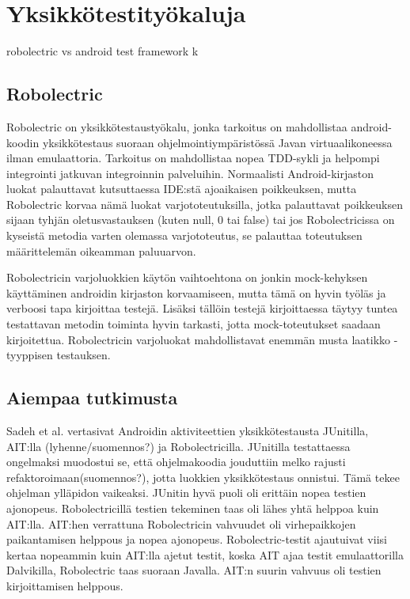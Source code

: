 \section{Yksikkötestityökaluja}

robolectric vs android test framework k

\subsection{Robolectric}

Robolectric on yksikkötestaustyökalu, jonka tarkoitus on mahdollistaa android-koodin yksikkötestaus suoraan ohjelmointiympäristössä Javan virtuaalikoneessa ilman emulaattoria. Tarkoitus on mahdollistaa nopea TDD-sykli ja helpompi integrointi jatkuvan integroinnin palveluihin. Normaalisti Android-kirjaston luokat palauttavat kutsuttaessa IDE:stä ajoaikaisen poikkeuksen, mutta Robolectric korvaa nämä luokat varjototeutuksilla, jotka palauttavat poikkeuksen sijaan tyhjän oletusvastauksen (kuten null, 0 tai false) tai jos Robolectricissa on kyseistä metodia varten olemassa varjototeutus, se palauttaa toteutuksen määrittelemän oikeamman paluuarvon.

Robolectricin varjoluokkien käytön vaihtoehtona on jonkin mock-kehyksen käyttäminen androidin kirjaston korvaamiseen, mutta tämä on hyvin työläs ja verboosi tapa kirjoittaa testejä. Lisäksi tällöin testejä kirjoittaessa täytyy tuntea testattavan metodin toiminta hyvin tarkasti, jotta mock-toteutukset saadaan kirjoitettua. Robolectricin varjoluokat mahdollistavat enemmän musta laatikko -tyyppisen testauksen. \cite{robolectric}

\subsection{Aiempaa tutkimusta}

Sadeh et al. vertasivat Androidin aktiviteettien yksikkötestausta JUnitilla, AIT:lla (lyhenne/suomennos?) ja Robolectricilla. JUnitilla testattaessa ongelmaksi muodostui se, että ohjelmakoodia jouduttiin melko rajusti refaktoroimaan(suomennos?), jotta luokkien yksikkötestaus onnistui. Tämä tekee ohjelman ylläpidon vaikeaksi. JUnitin hyvä puoli oli erittäin nopea testien ajonopeus. Robolectricillä testien tekeminen taas oli lähes yhtä helppoa kuin AIT:lla. AIT:hen verrattuna Robolectricin vahvuudet oli virhepaikkojen paikantamisen helppous ja nopea ajonopeus. Robolectric-testit ajautuivat viisi kertaa nopeammin kuin AIT:lla ajetut testit, koska AIT ajaa testit emulaattorilla Dalvikilla, Robolectric taas suoraan Javalla. AIT:n suurin vahvuus oli testien kirjoittamisen helppous.\cite{sadehetal11}

